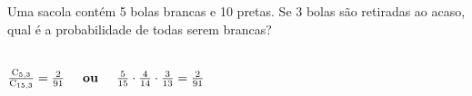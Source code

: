 \begin{ex}
Uma sacola contém 5 bolas brancas e 10 pretas. Se 3 bolas são retiradas ao acaso, qual é a probabilidade de todas serem brancas?
  \begin{sol}
    \phantom{A}\\
    $\frac{\mathrm{C}_{5,3}}{\mathrm{C}_{{15},3}}=\frac{2}{91}\hspace{0,5cm} \textbf{ou} \hspace{0,5cm} \frac{5}{15}\cdot\frac{4}{14}\cdot\frac{3}{13}=\frac{2}{91}$
    
  \end{sol}
\end{ex}